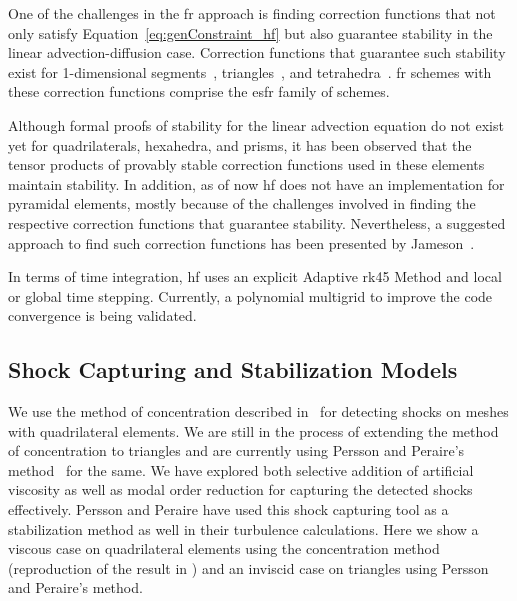 One of the challenges in the \gls{fr} approach is finding correction functions that not only satisfy Equation~\eqref{eq:genConstraint_hf} but also guarantee stability in the linear advection-diffusion case. Correction functions that guarantee such stability exist for 1-dimensional segments~\cite{vincent2011new}, triangles~\cite{castonguay2012new,williams2013tri}, and tetrahedra~\cite{williams2013tet}. \gls{fr} schemes with these correction functions comprise the \gls{esfr} family of schemes.

Although formal proofs of stability for the linear advection equation do not exist yet for quadrilaterals, hexahedra, and prisms, it has been observed that the tensor products of provably stable correction functions used in these elements maintain stability. In addition, as of now \gls{hf} does not have an implementation for pyramidal elements, mostly because of the challenges involved in finding the respective correction functions that guarantee stability. Nevertheless, a suggested approach to find such correction functions has been presented by Jameson~\cite{jameson2011advances}.

In terms of time integration, \gls{hf} uses an explicit Adaptive \gls{rk45} Method and local or global time stepping. Currently, a polynomial multigrid to improve the code convergence is being validated.

\subsection{Shock Capturing and Stabilization Models}

We use the method of concentration described in~\cite{Sheshadri2014} for detecting shocks on meshes with quadrilateral elements. We are still in the process of extending the method of concentration to triangles and are currently using Persson and Peraire's method~\cite{persson2006sub, Persson13} for the same. We have explored both selective addition of artificial viscosity as well as modal order reduction for capturing the detected shocks effectively. Persson and Peraire have used this shock capturing tool as a stabilization method as well in their turbulence calculations. Here we show a viscous case on quadrilateral elements using the concentration method (reproduction of the result in \cite{Sheshadri2014}) and an inviscid case on triangles using Persson and Peraire's method. \\

